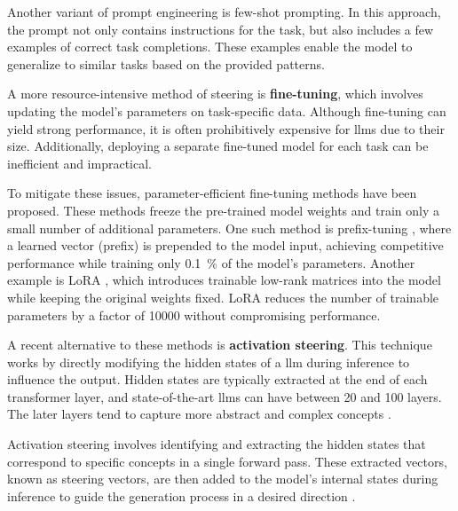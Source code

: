 Another variant of prompt engineering is few-shot prompting. In this approach, the prompt not only contains instructions for the task, but also includes a few examples of correct task completions. These examples enable the model to generalize to similar tasks based on the provided patterns.


A more resource-intensive method of steering is \textbf{fine-tuning}, which involves updating the model's parameters on task-specific data. Although fine-tuning can yield strong performance, it is often prohibitively expensive for \acp{llm} due to their size. Additionally, deploying a separate fine-tuned model for each task can be inefficient and impractical.

To mitigate these issues, parameter-efficient fine-tuning methods have been proposed. These methods freeze the pre-trained model weights and train only a small number of additional parameters. One such method is prefix-tuning \cite{liPrefixtuningOptimizingContinuous2021}, where a learned vector (prefix) is prepended to the model input, achieving competitive performance while training only \SI{0.1}{\percent} of the model's parameters. Another example is LoRA \cite{huLoRALowrankAdaptation2021}, which introduces trainable low-rank matrices into the model while keeping the original weights fixed. LoRA reduces the number of trainable parameters by a factor of \num{10000} without compromising performance.


A recent alternative to these methods is \textbf{activation steering}. This technique works by directly modifying the hidden states of a \ac{llm} during inference to influence the output. Hidden states are typically extracted at the end of each transformer layer, and state-of-the-art \acp{llm} can have between \num{20} and \num{100} layers. The later layers tend to capture more abstract and complex concepts \cite{bogdanEmergentEffectsScaling2025}.

Activation steering involves identifying and extracting the hidden states that correspond to specific concepts in a single forward pass. These extracted vectors, known as steering vectors, are then added to the model's internal states during inference to guide the generation process in a desired direction \cite{konenStyleVectorsSteering2024,turnerActivationAdditionSteering2024,subramaniExtractingLatentSteering2022}.
